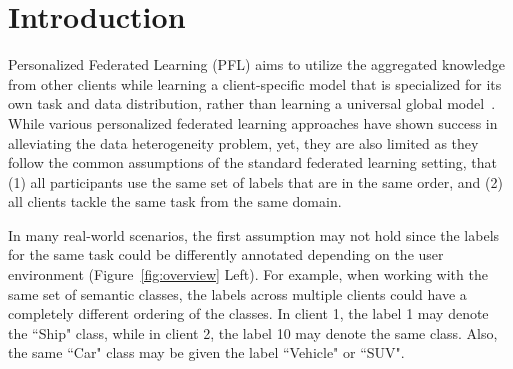 \section{Introduction}
\label{sec:intro}





Personalized Federated Learning (PFL) aims to utilize the aggregated knowledge from other clients while learning a client-specific model that is specialized for its own task and data distribution, rather than learning a universal global model~\citep{arivazhagan2019federated,liang2020think,fallah2020personalized,zhang2021personalized}. While various personalized federated learning approaches have shown success in alleviating the data heterogeneity problem, yet, they are also limited as they follow the common assumptions of the standard federated learning setting, that (1) all participants use the same set of labels that are in the same order, and (2) all clients tackle the same task from the same domain.

In many real-world scenarios, the first assumption may not hold since the labels for the same task could be differently annotated depending on the user environment (Figure~\ref{fig:overview} Left). For example, when working with the same set of semantic classes, the labels across multiple clients could have a completely different ordering of the classes. In client 1, the label 1 may denote the ``Ship" class, while in client 2, the label 10 may denote the same class. Also, the same ``Car" class may be given the label ``Vehicle" or ``SUV". 

